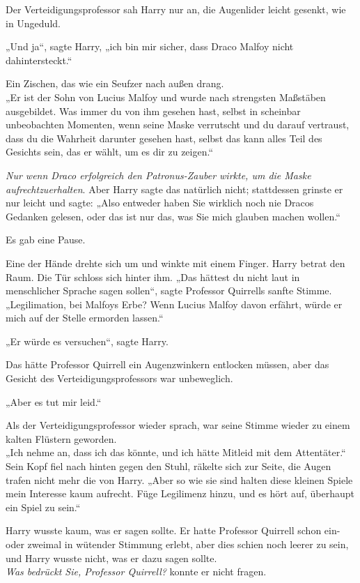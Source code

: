 {Der Verteidigungsprofessor sah Harry nur an, die Augenlider leicht gesenkt, wie in Ungeduld.

„Und ja“, sagte Harry, „ich bin mir sicher, dass Draco Malfoy nicht dahintersteckt.“

Ein Zischen, das wie ein Seufzer nach außen drang.\\ „Er ist der Sohn von Lucius Malfoy und wurde nach strengsten Maßstäben ausgebildet. Was immer du von ihm gesehen hast, selbst in scheinbar unbeobachten Momenten, wenn seine Maske verrutscht und du darauf vertraust, dass du die Wahrheit darunter gesehen hast, selbst das kann alles Teil des Gesichts sein, das er wählt, um es dir zu zeigen.“

\emph{Nur wenn Draco erfolgreich den Patronus-Zauber wirkte, um die Maske aufrechtzuerhalten}. Aber Harry sagte das natürlich nicht; stattdessen grinste er nur leicht und sagte: „Also entweder haben Sie wirklich noch nie Dracos Gedanken gelesen, oder das ist nur das, was Sie mich glauben machen wollen.“

Es gab eine Pause.

Eine der Hände drehte sich um und winkte mit einem Finger. Harry betrat den Raum. Die Tür schloss sich hinter ihm. „Das hättest du nicht laut in menschlicher Sprache sagen sollen“, sagte Professor Quirrells sanfte Stimme. „Legilimation, bei Malfoys Erbe? Wenn Lucius Malfoy davon erfährt, würde er mich auf der Stelle ermorden lassen.“

„Er würde es versuchen“, sagte Harry.

Das hätte Professor Quirrell ein Augenzwinkern entlocken müssen, aber das Gesicht des Verteidigungsprofessors war unbeweglich.

„Aber es tut mir leid.“

Als der Verteidigungsprofessor wieder sprach, war seine Stimme wieder zu einem kalten Flüstern geworden.\\ „Ich nehme an, dass ich das könnte, und ich hätte Mitleid mit dem Attentäter.“ Sein Kopf fiel nach hinten gegen den Stuhl, räkelte sich zur Seite, die Augen trafen nicht mehr die von Harry. „Aber so wie sie sind halten diese kleinen Spiele mein Interesse kaum aufrecht. Füge Legilimenz hinzu, und es hört auf, überhaupt ein Spiel zu sein.“

Harry wusste kaum, was er sagen sollte. Er hatte Professor Quirrell schon ein- oder zweimal in wütender Stimmung erlebt, aber dies schien noch leerer zu sein, und Harry wusste nicht, was er dazu sagen sollte.\\ \emph{Was bedrückt Sie, Professor Quirrell?} konnte er nicht fragen.

}
